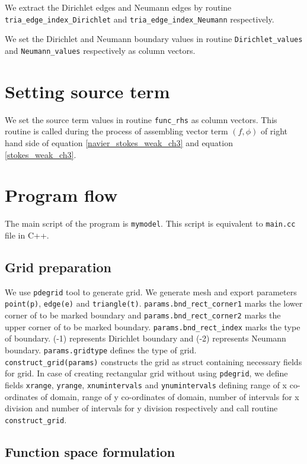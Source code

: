 \documentclass[a4paper,openany]{book}
\begin{document}
We extract the Dirichlet edges and Neumann edges by routine \verb|tria_edge_index_Dirichlet| and \verb|tria_edge_index_Neumann| respectively.

We set the Dirichlet and Neumann boundary values in routine \verb|Dirichlet_values| and \verb|Neumann_values| respectively as column vectors. 

\section{Setting source term}

We set the source term values in routine \verb|func_rhs| as column vectors. This routine is called during the process of assembling vector term $(f,\phi)$ of right hand side of equation \eqref{navier_stokes_weak_ch3} and equation \eqref{stokes_weak_ch3}.

\section{Program flow}

The main script of the program is \verb|mymodel|. This script is equivalent to \verb|main.cc| file in C++.

\subsection{Grid preparation}

We use \verb|pdegrid| tool to generate grid. We generate mesh and export parameters \verb|point(p)|, \verb|edge(e)| and \verb|triangle(t)|. \verb|params.bnd_rect_corner1| marks the lower corner of to be marked boundary and \verb|params.bnd_rect_corner2| marks the upper corner of to be marked boundary. \verb|params.bnd_rect_index| marks the type of boundary. (-1) represents Dirichlet boundary and (-2) represents Neumann boundary. \verb|params.gridtype| defines the type of grid. \\

\verb|construct_grid(params)| constructs the grid as struct containing necessary fields for grid. In case of creating rectangular grid without using \verb|pdegrid|, we define fields \verb|xrange|, \verb|yrange|, \verb|xnumintervals| and \verb|ynumintervals| defining range of x co-ordinates of domain, range of y co-ordinates of domain, number of intervals for x division and number of intervals for y division respectively and call routine \verb|construct_grid|.

\subsection{Function space formulation}
\end{document}
